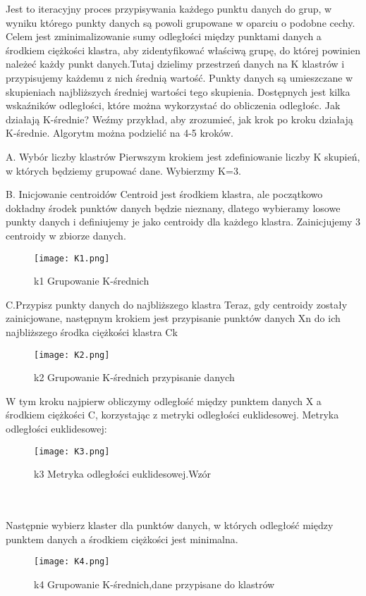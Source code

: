 Jest to iteracyjny proces przypisywania każdego punktu danych do grup, w wyniku którego punkty danych są powoli grupowane w oparciu o podobne cechy. Celem jest zminimalizowanie sumy odległości między punktami danych a środkiem ciężkości klastra, aby zidentyfikować właściwą grupę, do której powinien należeć każdy punkt danych.Tutaj dzielimy przestrzeń danych na K klastrów i przypisujemy każdemu z nich średnią wartość. Punkty danych są umieszczane w skupieniach najbliższych średniej wartości tego skupienia. Dostępnych jest kilka wskaźników odległości, które można wykorzystać do obliczenia odległośc.
Jak działają K-średnie?
Weźmy przykład, aby zrozumieć, jak krok po kroku działają K-średnie. Algorytm można podzielić na 4-5 kroków.


    A. Wybór liczby klastrów
Pierwszym krokiem jest zdefiniowanie liczby K skupień, w których będziemy grupować dane. Wybierzmy K=3.

    B. Inicjowanie centroidów
Centroid jest środkiem klastra, ale początkowo dokładny środek punktów danych będzie nieznany, dlatego wybieramy losowe punkty danych i definiujemy je jako centroidy dla każdego klastra. Zainicjujemy 3 centroidy w zbiorze danych.

\begin{figure}[h!]
    \label{fig:k1}
    \centering \texttt{[image: K1.png]}
    \caption{k1 Grupowanie K-średnich\cite{clust2020}}
\end{figure}
 \newpage
 C.Przypisz punkty danych do najbliższego klastra
Teraz, gdy centroidy zostały zainicjowane, następnym krokiem jest przypisanie punktów danych Xn do ich najbliższego środka ciężkości klastra Ck
\begin{figure}[!h]
    \label{fig:k2}
    \centering \texttt{[image: K2.png]}
    \caption{k2 Grupowanie K-średnich przypisanie danych\cite{clust2020}}
\end{figure}

W tym kroku najpierw obliczymy odległość między punktem danych X a środkiem ciężkości C, korzystając z metryki odległości euklidesowej.
Metryka odległości euklidesowej:
\begin{figure}[h!]
    \label{fig:k3}
    \centering \texttt{[image: K3.png]}
    \caption{k3 Metryka odległości euklidesowej.Wzór\cite{clust2020}}
\end{figure}
\\
\\

Następnie wybierz klaster dla punktów danych, w których odległość między punktem danych a środkiem ciężkości jest minimalna.
\begin{figure}[h!]
    \label{fig:k4}
    \centering \texttt{[image: K4.png]}
    \caption{k4 Grupowanie K-średnich,dane przypisane do klastrów\cite{clust2020}}
\end{figure}
  
